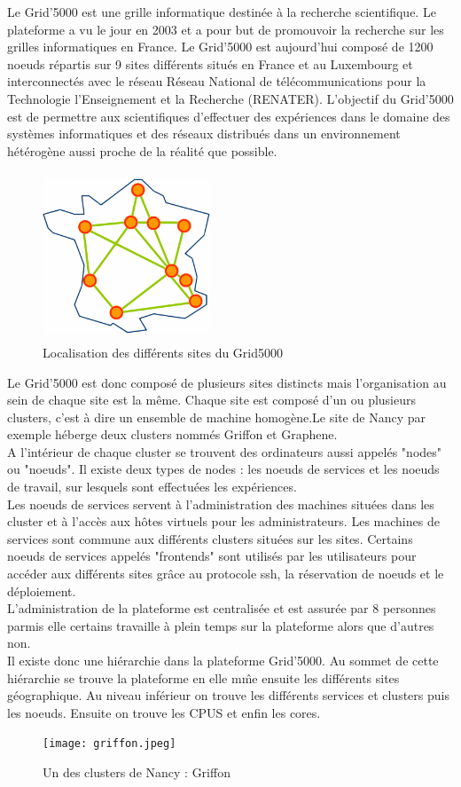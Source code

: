 \documentclass[a4paper, 10pt, onecolumn]{report}
\begin{document}
Le Grid'5000 est une grille informatique destinée à la recherche scientifique. Le plateforme a vu le jour en 2003 et a pour but de promouvoir la recherche sur les grilles informatiques en France. Le Grid'5000 est aujourd'hui composé de 1200 noeuds répartis sur 9 sites différents situés en France et au Luxembourg et interconnectés avec le réseau Réseau National de télécommunications pour la Technologie l'Enseignement et la Recherche (RENATER). L'objectif du Grid'5000 est de permettre aux scientifiques d'effectuer des expériences dans le domaine des systèmes informatiques et des réseaux distribués dans un environnement hétérogène aussi proche de la réalité que possible.

	\begin{figure}[!h]
		\centering
   		\includegraphics[width=5cm,height=5cm]{map.png}
   		\caption{Localisation des différents sites du Grid5000}
    	\label{fig:map}
	\end{figure} 

Le Grid'5000 est donc composé de plusieurs sites distincts mais l'organisation au sein de chaque site est la même. Chaque site est composé d'un ou plusieurs clusters, c'est à dire un ensemble de machine homogène.Le site de Nancy par exemple héberge deux clusters nommés Griffon et Graphene. \\
A l'intérieur de chaque cluster se trouvent des ordinateurs aussi appelés "nodes" ou "noeuds". Il existe deux types de nodes : les noeuds de services et les noeuds de travail, sur lesquels sont effectuées les expériences.\\
 Les noeuds de services servent à l'administration des machines situées dans les cluster et à l'accès aux hôtes virtuels pour les administrateurs. Les machines de services sont commune aux différents clusters situées sur les sites. Certains noeuds de services appelés "frontends" sont utilisés par les utilisateurs pour accéder aux différents sites grâce au protocole ssh, la réservation de noeuds et le déploiement. \\
L'administration de la plateforme est centralisée et est assurée par 8 personnes parmis elle certains travaille à plein temps sur la plateforme alors que d'autres non.\\
Il existe donc une hiérarchie dans la plateforme Grid'5000. Au sommet de cette hiérarchie se trouve la plateforme en elle m\^me ensuite les différents sites géographique. Au niveau inférieur on trouve les différents services et clusters puis les noeuds.  Ensuite on trouve les CPUS et enfin les cores.
\begin{figure}[!h]
		\centering
   		\texttt{[image: griffon.jpeg]}
   		\caption{Un des clusters de Nancy : Griffon}
    	\label{fig:griffon}
	\end{figure}
	
\end{document}
